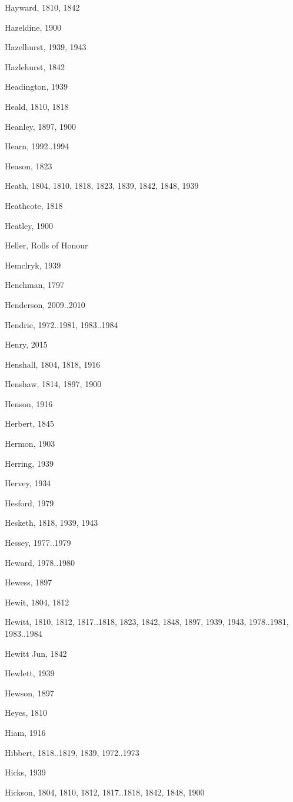 \begin{theindex}
\item Hayward, 1810, 1842
\item Hazeldine, 1900
\item Hazelhurst, 1939, 1943
\item Hazlehurst, 1842
\item Headington, 1939
\item Heald, 1810, 1818
\item Heanley, 1897, 1900
\item Hearn, 1992..1994
\item Heason, 1823
\item Heath, 1804, 1810, 1818, 1823, 1839, 1842, 1848, 1939
\item Heathcote, 1818
\item Heatley, 1900
\item Heller, Rolls of Honour
\item Hemclryk, 1939
\item Henchman, 1797
\item Henderson, 2009..2010
\item Hendrie, 1972..1981, 1983..1984
\item Henry, 2015
\item Henshall, 1804, 1818, 1916
\item Henshaw, 1814, 1897, 1900
\item Henson, 1916
\item Herbert, 1845
\item Hermon, 1903
\item Herring, 1939
\item Hervey, 1934
\item Hesford, 1979
\item Hesketh, 1818, 1939, 1943
\item Hessey, 1977..1979
\item Heward, 1978..1980
\item Hewess, 1897
\item Hewit, 1804, 1812
\item Hewitt, 1810, 1812, 1817..1818, 1823, 1842, 1848, 1897, 1939, 1943, 1978..1981, 1983..1984
\item Hewitt Jun, 1842
\item Hewlett, 1939
\item Hewson, 1897
\item Heyes, 1810
\item Hiam, 1916
\item Hibbert, 1818..1819, 1839, 1972..1973
\item Hicks, 1939
\item Hickson, 1804, 1810, 1812, 1817..1818, 1842, 1848, 1900

\end{theindex}
